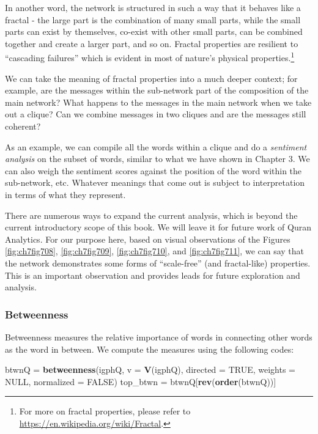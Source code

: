 \documentclass[
]{article}
\newenvironment{Shaded}{\begin{snugshade}}{\end{snugshade}}
\newcommand{\AttributeTok}[1]{\textcolor[rgb]{0.13,0.29,0.53}{#1}}
\newcommand{\ConstantTok}[1]{\textcolor[rgb]{0.56,0.35,0.01}{#1}}
\newcommand{\FunctionTok}[1]{\textcolor[rgb]{0.13,0.29,0.53}{\textbf{#1}}}
\newcommand{\NormalTok}[1]{#1}
\newcommand{\OtherTok}[1]{\textcolor[rgb]{0.56,0.35,0.01}{#1}}
\begin{document}
In another word, the network is structured in such a way that it behaves like a fractal - the large part is the combination of many small parts, while the small parts can exist by themselves, co-exist with other small parts, can be combined together and create a larger part, and so on. Fractal properties are resilient to ``cascading failures'' which is evident in most of nature's physical properties.\footnote{For more on fractal properties, please refer to \url{https://en.wikipedia.org/wiki/Fractal}.}

We can take the meaning of fractal properties into a much deeper context; for example, are the messages within the sub-network part of the composition of the main network? What happens to the messages in the main network when we take out a clique? Can we combine messages in two cliques and are the messages still coherent?

As an example, we can compile all the words within a clique and do a \emph{sentiment analysis} on the subset of words, similar to what we have shown in Chapter 3. We can also weigh the sentiment scores against the position of the word within the sub-network, etc. Whatever meanings that come out is subject to interpretation in terms of what they represent.

There are numerous ways to expand the current analysis, which is beyond the current introductory scope of this book. We will leave it for future work of Quran Analytics. For our purpose here, based on visual observations of the Figures \ref{fig:ch7fig708}, \ref{fig:ch7fig709}, \ref{fig:ch7fig710}, and \ref{fig:ch7fig711}, we can say that the network demonstrates some forms of ``scale-free'' (and fractal-like) properties. This is an important observation and provides leads for future exploration and analysis.

\hypertarget{betweenness-1}{%
\subsubsection{Betweenness}\label{betweenness-1}}

Betweenness measures the relative importance of words in connecting other words as the word in between. We compute the measures using the following codes:

\footnotesize

\begin{Shaded}
\begin{Highlighting}[]
\NormalTok{btwnQ }\OtherTok{=} \FunctionTok{betweenness}\NormalTok{(igphQ, }\AttributeTok{v =} \FunctionTok{V}\NormalTok{(igphQ), }\AttributeTok{directed =} \ConstantTok{TRUE}\NormalTok{, }
                    \AttributeTok{weights =} \ConstantTok{NULL}\NormalTok{, }\AttributeTok{normalized =} \ConstantTok{FALSE}\NormalTok{)}
\NormalTok{top\_btwn }\OtherTok{=}\NormalTok{ btwnQ[}\FunctionTok{rev}\NormalTok{(}\FunctionTok{order}\NormalTok{(btwnQ))]}
\end{Highlighting}
\end{Shaded}
\end{document}
